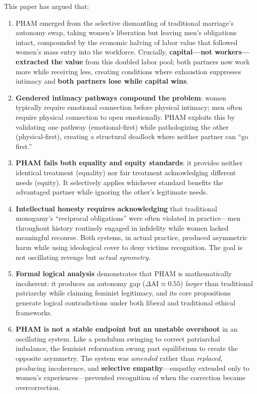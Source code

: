 \documentclass[12pt,openany]{book}
\numberwithin{equation}{chapter}
\begin{document}
This paper has argued that:

\begin{enumerate}
    \item PHAM emerged from the selective dismantling of traditional marriage's autonomy swap, taking women's liberation but leaving men's obligations intact, compounded by the economic halving of labor value that followed women's mass entry into the workforce. Crucially, \textbf{capital---not workers---extracted the value} from this doubled labor pool; both partners now work more while receiving less, creating conditions where exhaustion suppresses intimacy and \textbf{both partners lose while capital wins}.
    
    \item \textbf{Gendered intimacy pathways compound the problem}: women typically require emotional connection before physical intimacy; men often require physical connection to open emotionally. PHAM exploits this by validating one pathway (emotional-first) while pathologizing the other (physical-first), creating a structural deadlock where neither partner can ``go first.''
    
    \item \textbf{PHAM fails both equality and equity standards}: it provides neither identical treatment (equality) nor fair treatment acknowledging different needs (equity). It selectively applies whichever standard benefits the advantaged partner while ignoring the other's legitimate needs.
    
    \item \textbf{Intellectual honesty requires acknowledging} that traditional monogamy's ``reciprocal obligations'' were often violated in practice---men throughout history routinely engaged in infidelity while women lacked meaningful recourse. Both systems, in actual practice, produced asymmetric harm while using ideological cover to deny victims recognition. The goal is not oscillating revenge but \textit{actual symmetry}.
    
    \item \textbf{Formal logical analysis} demonstrates that PHAM is mathematically incoherent: it produces an autonomy gap ($\Delta \text{AI} \approx 0.55$) \textit{larger} than traditional patriarchy while claiming feminist legitimacy, and its core propositions generate logical contradictions under both liberal and traditional ethical frameworks.
    
    \item \textbf{PHAM is not a stable endpoint but an unstable overshoot} in an oscillating system. Like a pendulum swinging to correct patriarchal imbalance, the feminist reformation swung past equilibrium to create the opposite asymmetry. The system was \textit{amended} rather than \textit{replaced}, producing incoherence, and \textbf{selective empathy}---empathy extended only to women's experiences---prevented recognition of when the correction became overcorrection.
    

\end{enumerate}
\end{document}
